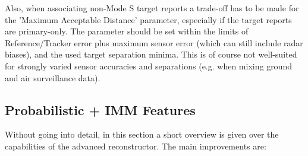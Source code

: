 Also, when associating non-Mode S target reports a trade-off has to be made for the 'Maximum Acceptable Distance' parameter, 
especially if the target reports are primary-only. The parameter should be set within the limits of Reference/Tracker error plus maximum sensor error (which can still include radar biases), and the used target separation minima. 
This is of course not well-suited for strongly varied sensor accuracies and separations (e.g. when mixing ground and air surveillance data). \\



\subsection{Probabilistic + IMM Features}

Without going into detail, in this section a short overview is given over the capabilities of the advanced reconstructor. The main improvements are:

